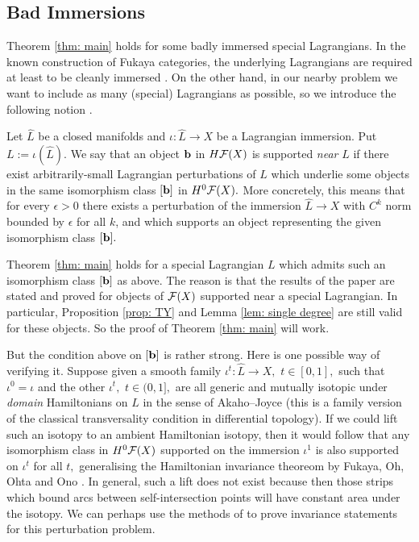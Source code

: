 \documentclass{article}
\theoremstyle{plain}%
\theoremstyle{definition}
\numberwithin{equation}{section}
\numberwithin{figure}{section}
\def\l{\label}
\def\cF{{\mathbin{\cal F}}}
\def\io{\iota}
\def\ep{\epsilon}
\begin{document}
\subsection{Bad Immersions}\l{sec: bad immersions}
Theorem \ref{thm: main} holds for some badly immersed special Lagrangians. 
In the known construction of Fukaya categories, the underlying Lagrangians are required at least to be cleanly immersed \cite{Fuk}.
On the other hand, in our nearby problem we want to include as many (special) Lagrangians as possible, so we introduce the following notion \cite[before Corollary 4.6]{I}.

Let $\hat L$ be a closed manifolds and $\io:\hat L\to X$ be a Lagrangian immersion. Put $L:=\io(\hat L).$
We say that an object ${\mathbf{b}}$ in $H\cF(X)$ is supported {\it near} $L$ if there exist arbitrarily-small Lagrangian perturbations of $L$ which underlie some objects in the same isomorphism class $[{\mathbf{b}}]$ in $H^0\cF(X).$ 
More concretely, this means that for every $\ep>0$ there exists a perturbation of the immersion $\hat L\to X$ with $C^k$ norm bounded by $\epsilon$ for all $k$, and which supports an object representing the given isomorphism class $[{\mathbf{b}}].$

Theorem \ref{thm: main} holds for a special Lagrangian $L$ which admits such an isomorphism class $[{\mathbf{b}}]$ as above. 
The reason is that the results of the paper \cite{I} are stated and proved for objects of $\cF(X)$ supported near a special Lagrangian. In particular, Proposition \ref{prop: TY} and Lemma \ref{lem: single degree} are still valid for these objects. So the proof of Theorem \ref{thm: main} will work. 

But the condition above on $[{\mathbf{b}}]$ is rather strong. Here is one possible way of verifying it.
Suppose given a smooth family $\io^t:\hat L\to X,$ $t\in[0,1],$ such that $\io^0=\io$ and the other $\io^t,$ $t\in(0,1],$ are all generic and mutually isotopic under {\it domain} Hamiltonians on $\hat L$ in the sense of Akaho--Joyce \cite[Definition 13.14 (ii)]{AJ} (this is a family version of the classical transversality condition in differential topology).
If we could lift such an isotopy to an ambient Hamiltonian isotopy, then it would follow that any isomorphism class in $H^0\cF(X)$ supported on the immersion $\io^1$ is also supported on $\io^t$ for all $t,$ generalising the Hamiltonian invariance theoreom by Fukaya, Oh, Ohta and Ono \cite{FOOO}. In general, such a lift does not exist because then those strips which bound arcs between self-intersection points will have constant area under the isotopy. We can perhaps use the methods of \cite{PW} to prove invariance statements for this perturbation problem.
\end{document}
